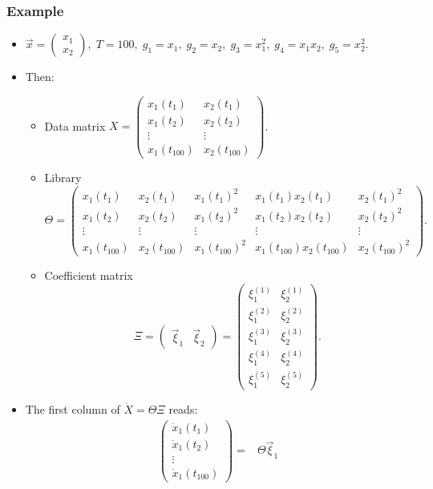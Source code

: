 \documentclass[20pt]{extarticle}
\begin{document}
\subsubsection*{Example}

\begin{itemize}
\item $\vec{x} = \begin{pmatrix} x_1 \\ x_2 \end{pmatrix}, \; T=100, \; g_1 = x_1, \; g_2 = x_2, \; g_3 = x_1^2, \; g_4 = x_1 x_2, \; g_5 = x_2^2$.
\item Then:
	\begin{itemize}
	\item Data matrix $X = \begin{pmatrix} x_1(t_1) & x_2(t_1) \\ x_1(t_2) & x_2(t_2) \\ \vdots & \vdots \\ x_1(t_{100}) & x_2(t_{100}) \end{pmatrix}$.
	\item Library
{\small
\[ \Theta = \begin{pmatrix} x_1(t_1) & x_2(t_1) & x_1(t_1)^2 & x_1(t_1) x_2(t_1) & x_2(t_1)^2 \\
x_1(t_2) & x_2(t_2) & x_1(t_2)^2 & x_1(t_2) x_2(t_2) & x_2(t_2)^2 \\
\vdots & \vdots & \vdots & \vdots & \vdots \\
 x_1(t_{100}) & x_2(t_{100}) & x_1(t_{100})^2 & x_1(t_{100}) x_2(t_{100}) & x_2(t_{100})^2 \end{pmatrix}. \]
}
	\item Coefficient matrix
\[ \Xi =
\begin{pmatrix} \vec{\xi}_1 & \vec{\xi}_2 \end{pmatrix} =
\begin{pmatrix} \xi_{1}^{(1)} & \xi_2^{(1)} \\
\xi_1^{(2)} & \xi_2^{(2)} \\
\xi_1^{(3)} & \xi_2^{(3)} \\
\xi_1^{(4)} & \xi_2^{(4)} \\
\xi_1^{(5)} & \xi_2^{(5)}
\end{pmatrix}. \]
	\end{itemize}
%
\item The first column of $\dot{X} = \Theta \Xi$ reads:
{\footnotesize
\[
\begin{aligned}
\begin{pmatrix} \dot{x}_1(t_1) \\ \dot{x}_1(t_2) \\ \vdots \\ \dot{x}_1(t_{100}) \end{pmatrix} =& \Theta \vec{\xi}_1

\end{aligned}\]}
\end{itemize}
\end{document}
